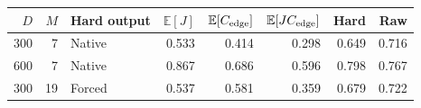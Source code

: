 \begin{tabular}{rrlrrrrr}
\toprule
$D$ & $M$ & Hard output & $\mathbb E[J]$ & $\mathbb E[C_{\rm edge}]$ & $\mathbb E[JC_{\rm edge}]$ & Hard & Raw \\
\midrule
300 & 7 & Native & 0.533 & 0.414 & 0.298 & 0.649 & 0.716 \\
600 & 7 & Native & 0.867 & 0.686 & 0.596 & 0.798 & 0.767 \\
300 & 19 & Forced & 0.537 & 0.581 & 0.359 & 0.679 & 0.722 \\
\bottomrule
\end{tabular}
